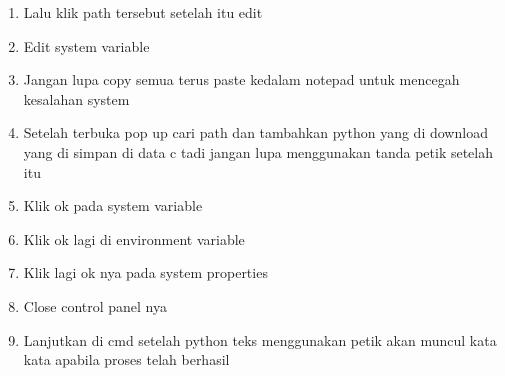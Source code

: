 \begin{enumerate}
\item	Lalu klik path tersebut setelah itu edit
	
\item	Edit system variable
	
\item	Jangan lupa copy semua terus paste kedalam notepad untuk mencegah kesalahan system
	
\item	Setelah terbuka pop up cari path dan tambahkan python yang di download yang di simpan di data c tadi jangan lupa menggunakan tanda petik setelah itu
	
\item	Klik ok pada system variable
\item	Klik ok lagi di environment variable
	
\item	Klik lagi ok nya pada system properties
	
\item	Close control panel nya
	
\item 	Lanjutkan di cmd setelah python teks menggunakan petik akan muncul kata kata apabila proses telah berhasil
\end{enumerate}

